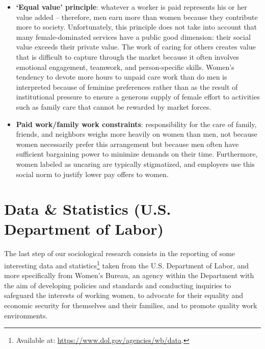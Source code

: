 \begin{itemize}
\item \textbf{`Equal value' principle}: whatever a worker is paid represents his or her value added -- therefore, men earn more than women because they contribute more to society. Unfortunately, this principle does not take into account that many female-dominated services have a public good dimension: their social value exceeds their private value. The work of caring for others creates value that is difficult to capture through the market because it often involves emotional engagement, teamwork, and person-specific skills. Women's tendency to devote more hours to unpaid care work than do men is interpreted because of feminine preferences rather than as the result of institutional pressure to ensure a generous supply of female effort to activities such as family care that cannot be rewarded by market forces.
\item \textbf{Paid work/family work constraints}: responsibility for the care of family, friends, and neighbors weighs more heavily on women than men, not because women necessarily prefer this arrangement but because men often have sufficient bargaining power to minimize demands on their time. Furthermore, women labeled as uncaring are typically stigmatized, and employers use this social norm to justify lower pay offers to women.
\end{itemize}


\section{Data \& Statistics (U.S. Department of Labor)}
\label{section:data_statistics_dol}
The last step of our sociological research consists in the reporting of some interesting data and statistics\footnote{Available at: \url{https://www.dol.gov/agencies/wb/data}.} taken from the U.S. Department of Labor, and more specifically from Women's Bureau, an agency within the Department with the aim of developing policies and standards and conducting inquiries to safeguard the interests of working women, to advocate for their equality and economic security for themselves and their families, and to promote quality work environments.

